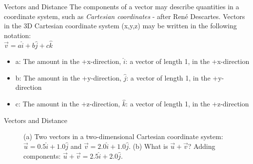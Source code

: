 \documentclass{beamer}
\begin{document}
\begin{frame}{Vectors and Distance}
\small
The components of a vector may describe quantities in a \alert{coordinate system}, such as \textit{Cartesian coordinates} - after Ren\'e Descartes.  Vectors in the 3D Cartesian coordinate system (x,y,z) may be written in the following notation:
\\
\vspace{0.2cm}
$\boxed{\vec{v} = a\hat{i} + b\hat{j} + c\hat{k}}$
\\
\begin{itemize}
\item a: The amount in the +x-direction, $\hat{i}$: a vector of length 1, in the +x-direction
\item b: The amount in the +y-direction, $\hat{j}$: a vector of length 1, in the +y-direction
\item c: The amount in the +z-direction, $\hat{k}$: a vector of length 1, in the +z-direction
\end{itemize}
\end{frame}

\begin{frame}{Vectors and Distance}
\begin{figure}
\centering
{}
\caption{\label{fig:twovectors} (a) Two vectors in a two-dimensional Cartesian coordinate system: $\vec{u} = 0.5\hat{i}+1.0\hat{j}$ and $\vec{v} = 2.0\hat{i}+1.0\hat{j}$.  (b) What is $\vec{u}+\vec{v}$?  Adding components: $\vec{u}+\vec{v} = 2.5\hat{i}+2.0\hat{j}$.}
\end{figure}
\end{frame}
\end{document}
